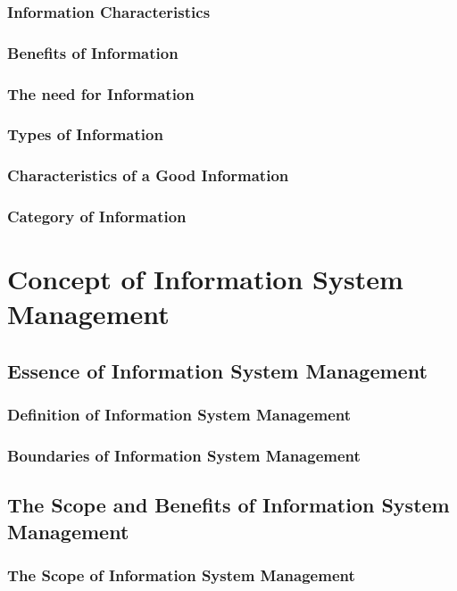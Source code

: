 \documentclass[12pt,titlepage]{article}
\begin{document}
\subsubsection{Information Characteristics}
\subsubsection{Benefits of Information}
\subsubsection{The need for Information}
\subsubsection{Types of Information}
\subsubsection{Characteristics of a Good Information}
\subsubsection{Category of Information}

\newpage

\section{Concept of Information System Management}

\subsection{Essence of Information System Management}
\subsubsection{Definition of Information System Management}
\subsubsection{Boundaries of Information System Management}

\subsection{The Scope and Benefits of Information System Management}
\subsubsection{The Scope of Information System Management}
\end{document}
